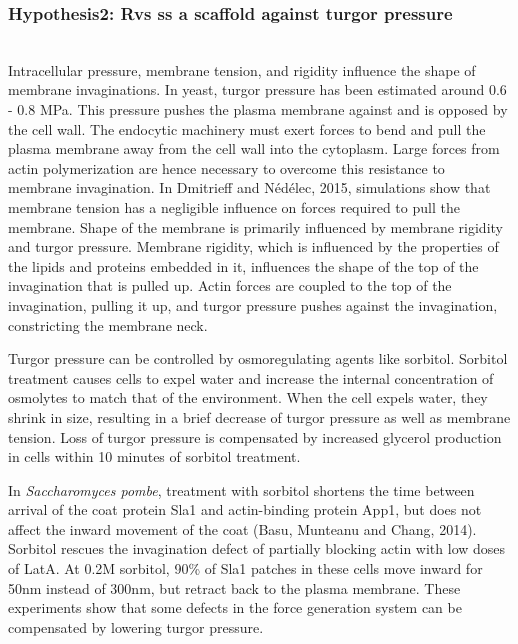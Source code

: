 \subsubsection{Hypothesis2: Rvs ss a scaffold against turgor pressure} 
	
	\mbox{}\\
Intracellular pressure, membrane tension, and rigidity influence the shape of membrane invaginations. In yeast, turgor pressure has been estimated around 0.6 - 0.8 MPa. This pressure pushes the plasma membrane against and is opposed by the cell wall. The endocytic machinery must exert forces to bend and pull the plasma membrane away from the cell wall into the cytoplasm. Large forces from actin polymerization are hence necessary to overcome this resistance to membrane invagination. In Dmitrieff and Nédélec, 2015, simulations show that membrane tension has a negligible influence on forces required to pull the membrane. Shape of the membrane is primarily influenced by membrane rigidity and turgor pressure. Membrane rigidity, which is influenced by the properties of the lipids and proteins embedded in it, influences the shape of the top of the invagination that is pulled up. Actin forces are coupled to the top of the invagination, pulling it up, and turgor pressure pushes against the invagination, constricting the membrane neck.  

Turgor pressure can be controlled by osmoregulating agents like sorbitol. Sorbitol treatment causes cells to expel water and increase the internal concentration of osmolytes to match that of the environment. When the cell expels water, they shrink in size, resulting in a brief decrease of turgor pressure as well as membrane tension. Loss of turgor pressure is compensated by increased glycerol production in cells within 10 minutes of sorbitol treatment.


In \textit{Saccharomyces pombe}, treatment with sorbitol shortens the time between arrival of the coat protein Sla1 and actin-binding protein App1, but does not affect the inward movement of the coat (Basu, Munteanu and Chang, 2014). Sorbitol rescues the invagination defect of partially blocking actin with low doses of LatA. At 0.2M sorbitol, 90\% of Sla1 patches in these cells move inward for 50nm instead of 300nm, but retract back to the plasma membrane. These experiments show that some defects in the force generation system can be compensated by lowering turgor pressure.  



